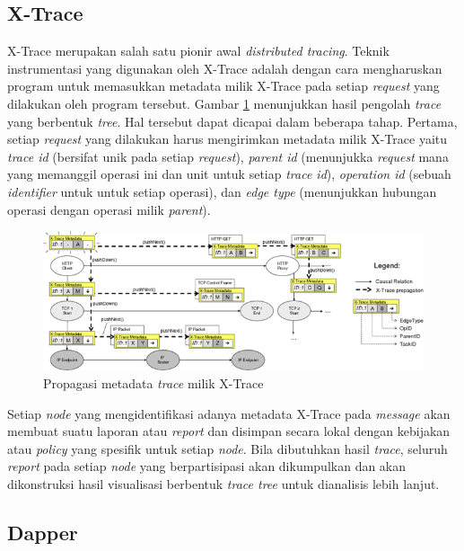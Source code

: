 \subsection{X-Trace}

X-Trace \citep{xtrace} merupakan salah satu pionir awal \textit{distributed tracing}. Teknik instrumentasi yang digunakan oleh X-Trace adalah dengan cara mengharuskan program untuk memasukkan metadata milik X-Trace pada setiap \textit{request} yang dilakukan oleh program tersebut. Gambar \ref{ch2-xtrace-1} menunjukkan hasil pengolah \textit{trace} yang berbentuk \textit{tree}. Hal tersebut dapat dicapai dalam beberapa tahap. Pertama, setiap \textit{request} yang dilakukan harus mengirimkan metadata milik X-Trace yaitu \textit{trace id} (bersifat unik pada setiap \textit{request}), \textit{parent id} (menunjukka \textit{request} mana yang memanggil operasi ini dan unit untuk setiap \textit{trace id}), \textit{operation id} (sebuah \textit{identifier} untuk untuk setiap operasi), dan \textit{edge type} (menunjukkan hubungan operasi dengan operasi milik \textit{parent}).
\begin{figure}[htb]
	\centering
	\includegraphics[width=1\textwidth]{resources/ch2/xtr-1.png}
	\caption{Propagasi metadata \textit{trace} milik X-Trace \citep{xtrace}}
	\label{ch2-xtrace-1}
\end{figure}

Setiap \textit{node} yang mengidentifikasi adanya metadata X-Trace pada \textit{message} akan membuat suatu laporan atau \textit{report} dan disimpan secara lokal dengan kebijakan atau \textit{policy} yang spesifik untuk setiap \textit{node}. Bila dibutuhkan hasil \textit{trace}, seluruh \textit{report} pada setiap \textit{node} yang berpartisipasi akan dikumpulkan dan akan dikonstruksi hasil visualisasi berbentuk \textit{trace tree} untuk dianalisis lebih lanjut.

\subsection{Dapper}

